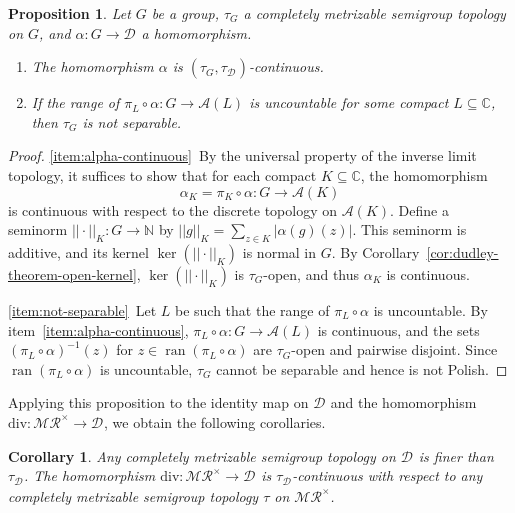 \documentclass[12pt]{paper}
\numberwithin{equation}{section}
\theoremstyle{plain}
\newtheorem{corollary}[theorem]{Corollary}
\newtheorem{proposition}[theorem]{Proposition}
\theoremstyle{definition}
\newcommand{\C}{\mathbb{C}}
\newcommand{\N}{\mathbb{N}}
\newcommand{\merom}[1][]{\mathcal{MR}_{#1}}
\newcommand{\meromnz}{\merom^{\times}}
\newcommand{\divis}[1][]{\mathcal{D}_{#1}}
\newcommand{\dm}{\mathrm{div}}      %
\DeclareMathOperator{\ran}{\mathrm{ran}}
\newcommand{\norm}[1]{||#1||}
\newcommand{\freeab}{\mathcal{A}}
\begin{document}
\begin{proposition}
  \label{prop:divis-inductive-topology-automatic-continuity}
  Let \(G\) be a group, \(\tau_{G}\) a completely metrizable semigroup topology on \(G\), and
  \(\alpha : G \to \divis\) a homomorphism.
  \begin{enumerate}[leftmargin=.6cm, label={\sf \arabic*}., ref={\sf \arabic*}]
  \item\label{item:alpha-continuous} The homomorphism \(\alpha\) is
    \((\tau_{G}, \tau_{\divis})\)-continuous.
  \item\label{item:not-separable} If the range of \(\pi_{L} \circ \alpha : G \to \freeab(L)\) is
    uncountable for some compact \(L \subseteq \C\), then \(\tau_{G}\) is not separable.
  \end{enumerate}
\end{proposition}

\begin{proof}
  \eqref{item:alpha-continuous}~By the universal property of the inverse limit topology, it suffices
  to show that for each compact \(K \subseteq \C\), the homomorphism
  \[\alpha_{K} = \pi_{K} \circ \alpha : G \to \freeab(K)\] is continuous with respect to the
  discrete topology on \(\freeab(K)\). Define a seminorm \(\norm{\cdot}_{K} : G \to \N\) by
  \(\norm{g}_{K} = \sum_{z \in K} |\alpha(g)(z)|\).  This seminorm is additive, and its kernel
  \(\ker(\norm{\cdot}_{K})\) is normal in \(G\).  By Corollary~\ref{cor:dudley-theorem-open-kernel},
  \(\ker(\norm{\cdot}_{K})\) is \(\tau_{G}\)-open, and thus \(\alpha_{K}\) is continuous.

  \eqref{item:not-separable}~Let \(L\) be such that the range of \(\pi_{L} \circ \alpha\) is
  uncountable.  By item~\eqref{item:alpha-continuous}, \(\pi_{L} \circ \alpha : G \to \freeab(L)\)
  is continuous, and the sets \((\pi_{L} \circ \alpha)^{-1}(z)\) for
  \(z \in \ran (\pi_{L} \circ \alpha) \) are \(\tau_{G}\)-open and pairwise disjoint.  Since
  \(\ran (\pi_{L} \circ \alpha)\) is uncountable, \(\tau_{G}\) cannot be separable and hence is not
  Polish.
\end{proof}

Applying this proposition to the identity map on \(\divis\) and the homomorphism
\(\dm : \meromnz \to \divis\), we obtain the following corollaries.

\begin{corollary}
  \label{cor:divis-inductive-topology-coarsest}
  Any completely metrizable semigroup topology on \(\divis\) is finer than \(\tau_{\divis}\).  The
  homomorphism \(\dm : \meromnz \to \divis \) is \(\tau_{\divis}\)-continuous with respect to any
  completely metrizable semigroup topology \(\tau\) on \(\meromnz\).
\end{corollary}
\end{document}
